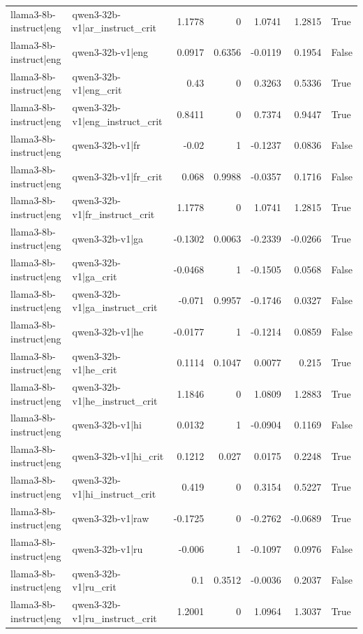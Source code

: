 \begin{table}
\begin{tabular}{l l r r r r l}
llama3-8b-instruct|eng & qwen3-32b-v1|ar_instruct_crit & 1.1778 & 0 & 1.0741 & 1.2815 & True \\
llama3-8b-instruct|eng & qwen3-32b-v1|eng & 0.0917 & 0.6356 & -0.0119 & 0.1954 & False \\
llama3-8b-instruct|eng & qwen3-32b-v1|eng_crit & 0.43 & 0 & 0.3263 & 0.5336 & True \\
llama3-8b-instruct|eng & qwen3-32b-v1|eng_instruct_crit & 0.8411 & 0 & 0.7374 & 0.9447 & True \\
llama3-8b-instruct|eng & qwen3-32b-v1|fr & -0.02 & 1 & -0.1237 & 0.0836 & False \\
llama3-8b-instruct|eng & qwen3-32b-v1|fr_crit & 0.068 & 0.9988 & -0.0357 & 0.1716 & False \\
llama3-8b-instruct|eng & qwen3-32b-v1|fr_instruct_crit & 1.1778 & 0 & 1.0741 & 1.2815 & True \\
llama3-8b-instruct|eng & qwen3-32b-v1|ga & -0.1302 & 0.0063 & -0.2339 & -0.0266 & True \\
llama3-8b-instruct|eng & qwen3-32b-v1|ga_crit & -0.0468 & 1 & -0.1505 & 0.0568 & False \\
llama3-8b-instruct|eng & qwen3-32b-v1|ga_instruct_crit & -0.071 & 0.9957 & -0.1746 & 0.0327 & False \\
llama3-8b-instruct|eng & qwen3-32b-v1|he & -0.0177 & 1 & -0.1214 & 0.0859 & False \\
llama3-8b-instruct|eng & qwen3-32b-v1|he_crit & 0.1114 & 0.1047 & 0.0077 & 0.215 & True \\
llama3-8b-instruct|eng & qwen3-32b-v1|he_instruct_crit & 1.1846 & 0 & 1.0809 & 1.2883 & True \\
llama3-8b-instruct|eng & qwen3-32b-v1|hi & 0.0132 & 1 & -0.0904 & 0.1169 & False \\
llama3-8b-instruct|eng & qwen3-32b-v1|hi_crit & 0.1212 & 0.027 & 0.0175 & 0.2248 & True \\
llama3-8b-instruct|eng & qwen3-32b-v1|hi_instruct_crit & 0.419 & 0 & 0.3154 & 0.5227 & True \\
llama3-8b-instruct|eng & qwen3-32b-v1|raw & -0.1725 & 0 & -0.2762 & -0.0689 & True \\
llama3-8b-instruct|eng & qwen3-32b-v1|ru & -0.006 & 1 & -0.1097 & 0.0976 & False \\
llama3-8b-instruct|eng & qwen3-32b-v1|ru_crit & 0.1 & 0.3512 & -0.0036 & 0.2037 & False \\
llama3-8b-instruct|eng & qwen3-32b-v1|ru_instruct_crit & 1.2001 & 0 & 1.0964 & 1.3037 & True \\

\end{tabular}
\end{table}
